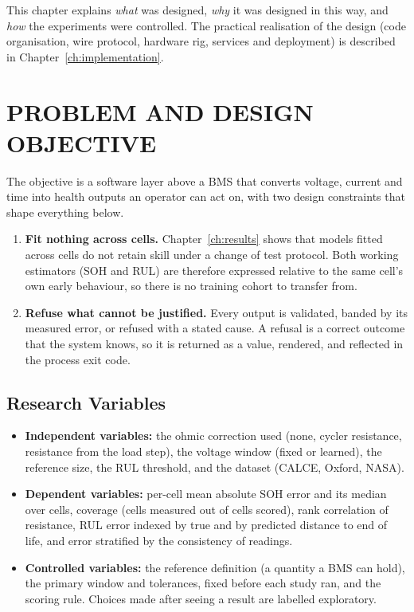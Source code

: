 \documentclass[12pt,a4paper]{amritareport}
\begin{document}
This chapter explains \emph{what} was designed, \emph{why} it was designed in this way, and \emph{how} the experiments were controlled. The practical realisation of the design (code organisation, wire protocol, hardware rig, services and deployment) is described in Chapter~\ref{ch:implementation}.

\section{PROBLEM AND DESIGN OBJECTIVE}
\label{sec:problem}

The objective is a software layer above a BMS that converts voltage, current and time into health outputs an operator can act on, with two design constraints that shape everything below.

\begin{enumerate}
    \item \textbf{Fit nothing across cells.} Chapter~\ref{ch:results} shows that models fitted across cells do not retain skill under a change of test protocol. Both working estimators (SOH and RUL) are therefore expressed relative to the same cell's own early behaviour, so there is no training cohort to transfer from.
    \item \textbf{Refuse what cannot be justified.} Every output is validated, banded by its measured error, or refused with a stated cause. A refusal is a correct outcome that the system knows, so it is returned as a value, rendered, and reflected in the process exit code.
\end{enumerate}

\subsection{Research Variables}

\begin{itemize}
    \item \textbf{Independent variables:} the ohmic correction used (none, cycler resistance, resistance from the load step), the voltage window (fixed or learned), the reference size, the RUL threshold, and the dataset (CALCE, Oxford, NASA).
    \item \textbf{Dependent variables:} per-cell mean absolute SOH error and its median over cells, coverage (cells measured out of cells scored), rank correlation of resistance, RUL error indexed by true and by predicted distance to end of life, and error stratified by the consistency of readings.
    \item \textbf{Controlled variables:} the reference definition (a quantity a BMS can hold), the primary window and tolerances, fixed before each study ran, and the scoring rule. Choices made after seeing a result are labelled exploratory.
\end{itemize}
\end{document}
